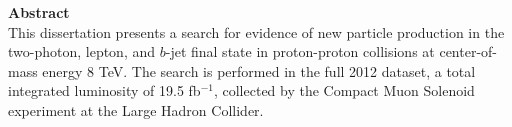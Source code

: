 \begin{center}

\textbf{\Large Abstract}\\[0.25in]

This dissertation presents a search for evidence of new particle production in the two-photon, lepton, and $b$-jet final state in proton-proton collisions at center-of-mass energy 8 TeV. The search is performed in the full 2012 dataset, a total integrated luminosity of 19.5 fb$^{-1}$, collected by the Compact Muon Solenoid experiment at the Large Hadron Collider.

\end{center}